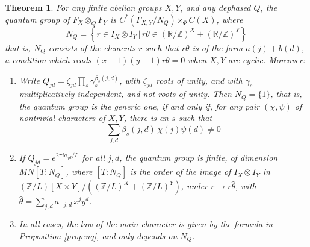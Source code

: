 \documentclass[11pt]{amsart}
\newtheorem{theorem}{Theorem}[section]
\begin{document}
\begin{theorem}\label{thm:cyclic}
For any finite abelian groups $X,Y$, and any dephased $Q$, the quantum group of $F_X\otimes_QF_Y$ is $C^*(\Gamma_{X,Y}/N_Q)\rtimes_\Phi C(X)$, where
$$N_Q=\left\{r\in I_X\otimes I_Y\,\Big|\,r\theta\in(\mathbb R/\mathbb Z)^X+(\mathbb R/\mathbb Z)^Y\right\}$$
that is, $N_Q$ consists of the elements $r$ such that $r\theta$ is of the form $a(j)+b(d)$, a condition which reads $(x-1)(y-1)r\theta=0$ when $X,Y$ are cyclic. Moreover:
\begin{enumerate}
\item Write $Q_{jd}=\zeta_{jd}\prod_s\gamma_s^{\beta_s(j,d)}$, with $\zeta_{jd}$ roots of unity, and with $\gamma_s$ multiplicatively independent, and not roots of unity. Then $N_Q=\{1\}$, that is, the quantum group is the generic one, if and only if, for any pair $(\chi,\psi)$ of nontrivial characters of $X,Y$, there is an $s$ such that
$$\sum_{j,d}\beta_s(j,d)\,\bar{\chi}(j)\psi(d)\neq0$$

\item If $Q_{jd}=e^{2\pi ia_{jd}/L}$ for all $j,d$, the quantum group is finite, of dimension $MN[T:N_Q]$, where $[T:N_Q]$ is the order of the image of $I_X\otimes I_Y$ in $(\mathbb Z/L)[X\times Y]/((\mathbb Z/L)^X+(\mathbb Z/L)^Y)$, under $r\to r\hat{\theta}$, with $\hat{\theta}=\sum_{j,d}a_{-j,d}\,x^jy^d$.

\item In all cases, the law of the main character is given by the formula in Proposition \ref{prop:nq}, and only depends on $N_Q$.
\end{enumerate}
\end{theorem}
\end{document}
